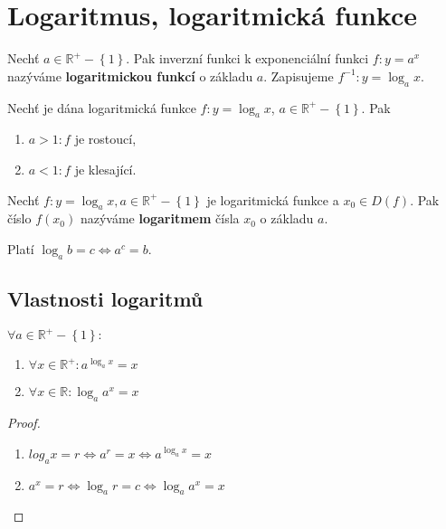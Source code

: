 \section{Logaritmus, logaritmická funkce}
\begin{definition}
    Nechť $a \in \mathbb R^+ - \left \{ 1 \right \} $. Pak inverzní
    funkci k exponenciální funkci $f:y=a^x$ nazýváme \textbf{logaritmickou
    funkcí} o základu $a$. Zapisujeme $f^{-1}: y=\log_a x.$
\end{definition}

\begin{veta}
    Nechť je dána logaritmická funkce $f:y=\log_a x$, $a \in \mathbb R^+ -
    \left \{ 1 \right \} $. Pak
    \begin{enumerate}[$i.$]
        \item $a>1: f$ je rostoucí,
       	\item $a < 1: f$ je klesající.
    \end{enumerate}
\end{veta}

\begin{definition}
    Nechť $f: y=\log_a x, a \in \mathbb R^+ - \left \{ 1 \right \}$ je
    logaritmická funkce a $x_0\in D(f).$ Pak číslo $f(x_0)$ nazýváme
    \textbf{logaritmem} čísla $x_0$ o základu $a.$
\end{definition}

\begin{pozn}
    Platí $\log_a b=c \iff a^c = b.$
\end{pozn}

\subsection*{Vlastnosti logaritmů}
\begin{veta}
    $\forall a \in \mathbb R^+ - \left \{ 1 \right \}:$
    \begin{enumerate}[$i.$]
        \item $\forall x \in \mathbb R^+: a^{\log_a x}=x$
       	\item $\forall x \in \mathbb R: \log_a a^x=x$
    \end{enumerate}
\end{veta}

\begin{proof}
    \begin{enumerate}[$i.$]
        \item $log_a x = r \iff a^r = x \iff a^{\log_a x}=x$
       	\item $a^x = r \iff \log_a r=c \iff \log_a a^x = x$ \qedhere
    \end{enumerate}
\end{proof}


